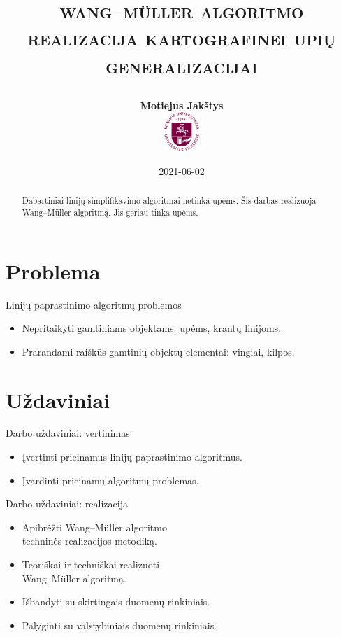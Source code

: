 \documentclass[14pt]{beamer}
\title{
    \Large\textsc{wang–müller algoritmo realizacija 
    kartografinei upių generalizacijai}

}
\author{\small \bf Motiejus Jakštys \\[4ex]
    \includegraphics[height=4em]{vu}
}
\date{\small 2021-06-02}
\newcommand{\WM}{Wang--M{\"u}ller}
\begin{document}

\begin{frame}
\titlepage
\end{frame}

\begin{frame}
  \begin{abstract}
    Dabartiniai linijų simplifikavimo algoritmai netinka upėms. Šis darbas
    realizuoja {\WM} algoritmą. Jis geriau tinka upėms.
  \end{abstract}
\end{frame}

\section{Problema}

\begin{frame}{Linijų paprastinimo algoritmų problemos}
    \begin{itemize}

        \item Nepritaikyti gamtiniams objektams: upėms, krantų linijoms.

        \item Prarandami raiškūs gamtinių objektų elementai: vingiai, kilpos.

    \end{itemize}
\end{frame}

\section{Uždaviniai}

\begin{frame}{Darbo uždaviniai: vertinimas}
    \begin{itemize}
        \item Įvertinti prieinamus linijų paprastinimo algoritmus.
        \item Įvardinti prieinamų algoritmų problemas.
    \end{itemize}
\end{frame}


\begin{frame}{Darbo uždaviniai: realizacija}
    \begin{itemize}
        \item Apibrėžti {\WM} algoritmo \\ techninės realizacijos metodiką.
        \item Teoriškai ir techniškai realizuoti \\ {\WM} algoritmą.
        \item Išbandyti su skirtingais duomenų rinkiniais.
        \item Palyginti su valstybiniais duomenų rinkiniais.
    \end{itemize}
\end{frame}
\end{document}
